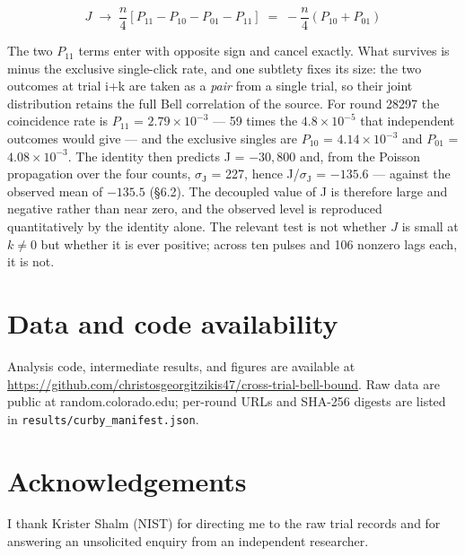 \documentclass[
  11pt,
]{article}
\begin{document}
\begin{equation}
J \;\to\; \frac{n}{4}\left[P_{11} - P_{10} - P_{01} - P_{11}\right] \;=\; -\frac{n}{4}\left(P_{10} + P_{01}\right)
\label{eq:eberhard-lag}
\end{equation}

The two \(P_{11}\) terms enter with opposite sign and cancel exactly.
What survives is minus the exclusive single-click rate, and one subtlety
fixes its size: the two outcomes at trial i+k are taken as a \emph{pair}
from a single trial, so their joint distribution retains the full Bell
correlation of the source. For round 28297 the coincidence rate is
\(P_{11}\) = \(2.79 \times 10^{-3}\) --- 59 times the
\(4.8 \times 10^{-5}\) that independent outcomes would give --- and the
exclusive singles are \(P_{10}\) = \(4.14 \times 10^{-3}\) and
\(P_{01}\) = \(4.08 \times 10^{-3}\). The identity then predicts J =
\(-30,800\) and, from the Poisson propagation over the four counts,
\(\sigma_{\mathrm{J}}\) = 227, hence J/\(\sigma_{\mathrm{J}}\) =
\(-135.6\) --- against the observed mean of \(-135.5\) (\S6.2). The
decoupled value of J is therefore large and negative rather than near
zero, and the observed level is reproduced quantitatively by the
identity alone. The relevant test is not whether \(J\) is small at
\(k \ne 0\) but whether it is ever positive; across ten pulses and 106
nonzero lags each, it is not.

\section*{Data and code availability}

Analysis code, intermediate results, and figures are available at
\url{https://github.com/christosgeorgitzikis47/cross-trial-bell-bound}.
Raw data are public at random.colorado.edu; per-round URLs and SHA-256
digests are listed in \texttt{results/curby\_manifest.json}.

\section*{Acknowledgements}

I thank Krister Shalm (NIST) for directing me to the raw trial records
and for answering an unsolicited enquiry from an independent researcher.
\end{document}
